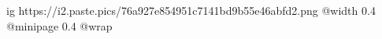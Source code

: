  
 
 
 
 

\ifcmt
  ig https://i2.paste.pics/76a927e854951c7141bd9b55e46abfd2.png
  @width 0.4
  @minipage 0.4
  @wrap \parpic[r]
\fi
